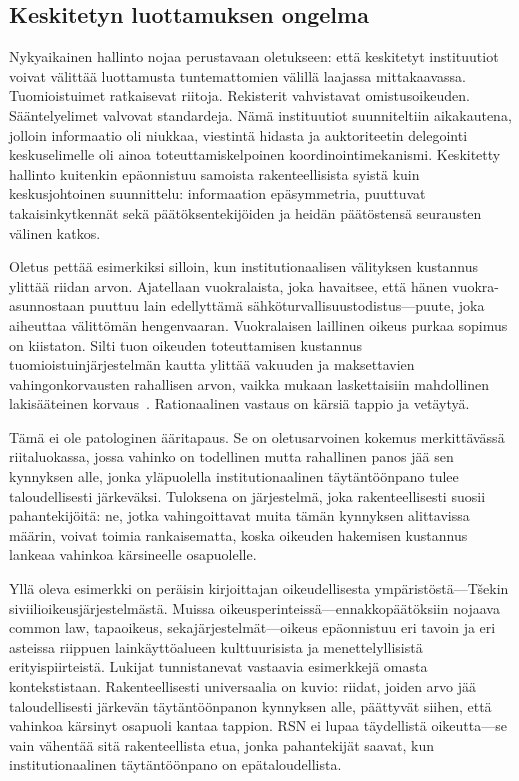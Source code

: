 \documentclass[11pt,a4paper,twocolumn]{article}
\begin{document}
\subsection{Keskitetyn luottamuksen ongelma}

Nykyaikainen hallinto nojaa perustavaan oletukseen: että keskitetyt instituutiot voivat välittää luottamusta tuntemattomien välillä laajassa mittakaavassa. Tuomioistuimet ratkaisevat riitoja. Rekisterit vahvistavat omistusoikeuden. Sääntelyelimet valvovat standardeja. Nämä instituutiot suunniteltiin aikakautena, jolloin informaatio oli niukkaa, viestintä hidasta ja auktoriteetin delegointi keskuselimelle oli ainoa toteuttamiskelpoinen koordinointimekanismi. Keskitetty hallinto kuitenkin epäonnistuu samoista rakenteellisista syistä kuin keskusjohtoinen suunnittelu: informaation epäsymmetria, puuttuvat takaisinkytkennät sekä päätöksentekijöiden ja heidän päätöstensä seurausten välinen katkos.

Oletus pettää esimerkiksi silloin, kun institutionaalisen välityksen kustannus ylittää riidan arvon. Ajatellaan vuokralaista, joka havaitsee, että hänen vuokra-asunnostaan puuttuu lain edellyttämä sähköturvallisuustodistus---puute, joka aiheuttaa välittömän hengenvaaran. Vuokralaisen laillinen oikeus purkaa sopimus on kiistaton. Silti tuon oikeuden toteuttamisen kustannus tuomioistuinjärjestelmän kautta ylittää vakuuden ja maksettavien vahingonkorvausten rahallisen arvon, vaikka mukaan laskettaisiin mahdollinen lakisääteinen korvaus~\cite{czcourtfees}. Rationaalinen vastaus on kärsiä tappio ja vetäytyä.

Tämä ei ole patologinen ääritapaus. Se on oletusarvoinen kokemus merkittävässä riitaluokassa, jossa vahinko on todellinen mutta rahallinen panos jää sen kynnyksen alle, jonka yläpuolella institutionaalinen täytäntöönpano tulee taloudellisesti järkeväksi. Tuloksena on järjestelmä, joka rakenteellisesti suosii pahantekijöitä: ne, jotka vahingoittavat muita tämän kynnyksen alittavissa määrin, voivat toimia rankaisematta, koska oikeuden hakemisen kustannus lankeaa vahinkoa kärsineelle osapuolelle.

Yllä oleva esimerkki on peräisin kirjoittajan oikeudellisesta ympäristöstä---Tšekin siviilioikeusjärjestelmästä. Muissa oikeusperinteissä---ennakkopäätöksiin nojaava common law, tapaoikeus, sekajärjestelmät---oikeus epäonnistuu eri tavoin ja eri asteissa riippuen lainkäyttöalueen kulttuurisista ja menettelyllisistä erityispiirteistä. Lukijat tunnistanevat vastaavia esimerkkejä omasta kontekstistaan. Rakenteellisesti universaalia on kuvio: riidat, joiden arvo jää taloudellisesti järkevän täytäntöönpanon kynnyksen alle, päättyvät siihen, että vahinkoa kärsinyt osapuoli kantaa tappion. RSN ei lupaa täydellistä oikeutta---se vain vähentää sitä rakenteellista etua, jonka pahantekijät saavat, kun institutionaalinen täytäntöönpano on epätaloudellista.
\end{document}
